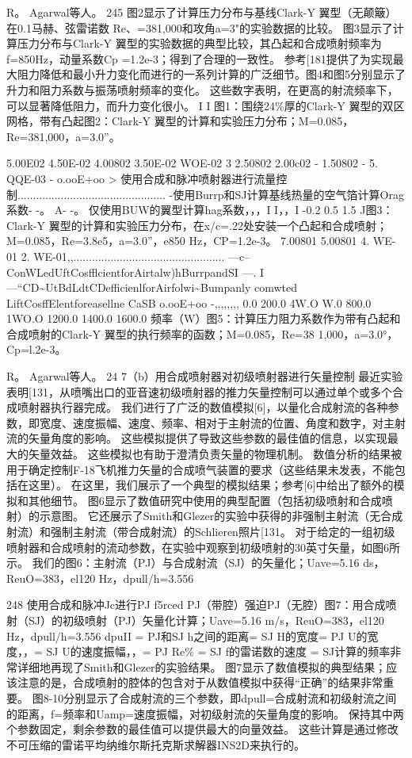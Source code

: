 \documentclass[UTF8,11pt,a4paper,openany,fontset=fandol]{ctexbook}
\begin{document}
R。 Agarwal等人。 245 图2显示了计算压力分布与基线Clark-Y 翼型（无颠簸）在0.1马赫、弦雷诺数 Re、=381,000和攻角a=3"的实验数据的比较。 图3显示了计算压力分布与Clark-Y 翼型的实验数据的典型比较，其凸起和合成喷射频率为f=850Hz，动量系数Cp =1.2e-3；得到了合理的一致性。 参考[181提供了为实现最大阻力降低和最小升力变化而进行的一系列计算的广泛细节。图4和图5分别显示了升力和阻力系数与振荡喷射频率的变化。 这些数字表明，在更高的射流频率下，可以显著降低阻力，而升力变化很小。 I I 图1：围绕24\%厚的Clark-Y 翼型的双区网格，带有凸起图2：Clark-Y 翼型的计算和实验压力分布；M=0.085，Re=381,000，a=3.0”。

5.00E02 4.50E-02 4.00802 3.50E-02 WOE-02 3 2.50802 2.00c02 - 1.50802 - 5. QQE-03 - o.ooE+oo > 使用合成和脉冲喷射器进行流量控制................................................ -使用Burrp和SJ计算基线热量的空气箔计算Orag系数- -。 A- -。 仅使用BUW的翼型计算hag系数，，，I I，，I -0.2 0.5 1.5 J图3：Clark-Y 翼型的计算和实验压力分布，在x/c=.22处安装一个凸起和合成喷射；M=0.085，Re=3.8e5，a=3.0”，e850 Hz，CP=1.2e-3。 7.00801 5.00801 4. WE-01 2. WE-01,,................................................. ---c--ConWLedUftCosfflcientforAirtalw)hBurrpandSI ---. I---“CD\textasciitilde{}UtBdLdtCDefficienlforAirfolwi\textasciitilde{}Bumpanly comwted LiftCosffElentforeasellne CaSB o.ooE+oo -,,,,,,,, 0.0 200.0 4W.O W.0 800.0 1WO.O 1200.0 1400.0 1600.0 频率（W）图5：计算压力阻力系数作为带有凸起和合成喷射的Clark-Y 翼型的执行频率的函数；M=0.085，Re=38 1,000，a=3.0°，Cp=l.2e-3。

R。 Agarwal等人。 24 7（b）用合成喷射器对初级喷射器进行矢量控制 最近实验表明[131，从喷嘴出口的亚音速初级喷射器的推力矢量控制可以通过单个或多个合成喷射器执行器完成。 我们进行了广泛的数值模拟[6]，以量化合成射流的各种参数，即宽度、速度振幅、速度、频率、相对于主射流的位置、角度和数字，对主射流的矢量角度的影响。 这些模拟提供了导致这些参数的最佳值的信息，以实现最大的矢量效益。 这些模拟也有助于澄清负责矢量的物理机制。 数值分析的结果被用于确定控制F-18飞机推力矢量的合成喷气装置的要求（这些结果未发表，不能包括在这里）。 在这里，我们展示了一个典型的模拟结果；参考[6]中给出了额外的模拟和其他细节。 图6显示了数值研究中使用的典型配置（包括初级喷射和合成喷射）的示意图。 它还展示了Smith和Glezer的实验中获得的非强制主射流（无合成射流）和强制主射流（带合成射流）的Schlieren照片[131。 对于给定的一组初级喷射器和合成喷射的流动参数，在实验中观察到初级喷射的30英寸矢量，如图6所示。 我们的图6：主射流（PJ）与合成射流（SJ）的矢量化；Uave=5.16 ds，ReuO=383，el120 Hz，dpull/h=3.556

248 使用合成和脉冲Jc进行PJ f5rced PJ（带腔）强迫PJ（无腔）图7：用合成喷射（SJ）的初级喷射（PJ）矢量化计算；Uave=5.16 m/s，ReuO=383，el120 Hz，dpull/h=3.556 dpuII = PJ和SJ h之间的距离= SJ H的宽度= PJ U的宽度，，= SJ U的速度振幅，，= PJ Re\% = SJ f的雷诺数的速度 = SJ计算的频率非常详细地再现了Smith和Glezer的实验结果。 图7显示了数值模拟的典型结果；应该注意的是，合成喷射的腔体的包含对于从数值模拟中获得“正确”的结果非常重要。 图8-10分别显示了合成射流的三个参数，即dpull=合成射流和初级射流之间的距离，f=频率和Uamp=速度振幅，对初级射流的矢量角度的影响。 保持其中两个参数固定，剩余参数的最佳值可以提供最大的向量效益。 这些计算是通过修改不可压缩的雷诺平均纳维尔斯托克斯求解器INS2D来执行的。
\end{document}
